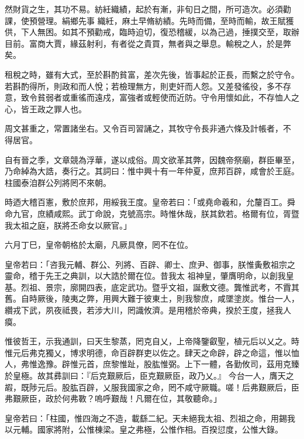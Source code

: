 \begin{pinyinscope}
 然財貨之生，其功不易。紡紝織績，起於有漸，非旬日之間，所可造次。必須勸課，使預營理。絹鄉先事
 織紝，麻土早脩紡績。先時而備，至時而輸，故王賦獲供，下人無困。如其不預勸戒，臨時迫切，復恐稽緩，以為己過，捶撲交至，取辦目前。富商大賈，緣茲射利，有者從之貴買，無者與之舉息。輸稅之人，於是弊矣。



 租稅之時，雖有大式，至於斟酌貧富，差次先後，皆事起於正長，而繫之於守令。若斟酌得所，則政和而人悅；若檢理無方，則吏奸而人怨。又差發徭役，多不存意，致令貧弱者或重徭而遠戍，富強者或輕使而近防。守令用懷如此，不存恤人之心，皆王政之罪人也。



 周文甚重之，常置諸坐右。又令百司習誦之，其牧守令長非通六條及計帳者，不
 得居官。



 自有晉之季，文章競為浮華，遂以成俗。周文欲革其弊，因魏帝祭廟，群臣畢至，乃命綽為大誥，奏行之。其詞曰：惟中興十有一年仲夏，庶邦百辟，咸會於王庭。柱國泰洎群公列將罔不來朝。



 時迺大稽百憲，敷於庶邦，用綏我王度。皇帝若曰：「或堯命羲和，允釐百工。舜命九官，庶績咸熙。武丁命說，克號高宗。時惟休哉，朕其欽若。格爾有位，胥暨我太祖之庭，朕將丕命女以厥官。」



 六月丁巳，皇帝朝格於太廟，凡厥具僚，罔不在位。



 皇帝若曰：「咨我元輔、群公、列將、百辟、卿士、庶尹、御事，朕惟夤敷祖宗之靈命，稽于先王之典訓，以大誥於爾在位。昔我太
 祖神皇，肇膺明命，以創我皇基。烈祖、景宗，廓開四表，底定武功。暨乎文祖，誕敷文德。龔惟武考，不霣其舊。自時厥後，陵夷之弊，用興大難于彼東土，則我黎庶，咸墜塗炭。惟台一人，纘戎下武，夙夜祗畏，若涉大川，罔識攸濟。是用稽於帝典，揆於王度，拯我人瘼。



 惟彼哲王，示我通訓，曰天生黎蒸，罔克自乂，上帝降鑒叡聖，植元后以乂之。時惟元后弗克獨乂，博求明德，命百辟群吏以佐之。肆天之命辟，辟之命這，惟以恤人，弗惟逸豫。辟惟元首，庶黎惟趾，股肱惟弼。上下一體，各勤攸司，茲用克臻於皇極。故其彞訓曰：『后克艱厥后，臣克艱厥臣，政乃乂。』
 今台一人，膺天之嘏，既陟元后。股肱百辟，乂服我國家之命，罔不咸守厥職。嗟！后弗艱厥后，臣弗艱厥臣，政於何弗斁？嗚呼艱哉！凡爾在位，其敬聽命。」



 皇帝若曰：「柱國，惟四海之不造，載繇二紀。天未絕我太祖、烈祖之命，用錫我以元輔。國家將附，公惟棟梁。皇之弗極，公惟作相。百揆愆度，公惟大錄。




\end{pinyinscope}
